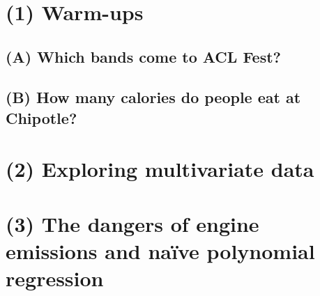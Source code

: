 \documentclass[symmetric]{assignment}
\title{\upshape\scshape\textosf{3 $\cdot$ Exercises}}
\author{\upshape\scshape\textosf{Paul Nguyen $\cdot$ SDS 325H}}
\date{\upshape\textosf{February \nth{15}, 2016}}
\begin{document}
\maketitle

\section{\bfseries\upshape(1) Warm-ups}
\subsection{(A) Which bands come to ACL Fest?}


\subsection{(B) How many calories do people eat at Chipotle?}


\section{\bfseries\upshape(2) Exploring multivariate data}


\section{\bfseries\upshape(3) The dangers of engine emissions and naïve polynomial regression}
\end{document}
